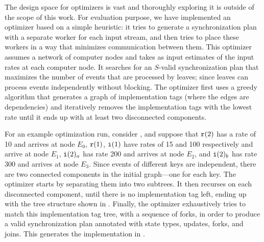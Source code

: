 The design space for optimizers is vast and thoroughly exploring it is
outside of the scope of this work. For evaluation purpose, we have implemented an optimizer based on a simple
heuristic: it tries to generate a synchronization plan with a
separate worker for each input stream, and then tries to place these
workers in a way that minimizes communication between them.
This optimizer assumes a network of computer nodes and takes as input
estimates of the input rates at each computer node. It searches for an
$S$-valid synchronization plan that maximizes the number of events
that are processed by leaves; since leaves can process events
independently without blocking. The optimizer first uses a greedy
algorithm that generates a graph of implementation tags (where the
edges are dependencies) and iteratively removes the implementation
tags with the lowest rate until it ends up with at least two
disconnected components. 

\begin{example}
\label{example:optimization}
For an example optimization run, consider ,
and suppose that $\texttt{r}(2)$ has a rate of 10 and arrives at node $E_0$,
$\texttt{r}(1)$, $\texttt{i}(1)$ have rates of 15 and 100 respectively and arrive at node $E_1$,
$\texttt{i}(2)_a$ has rate 200 and arrives at node $E_2$,
and $\texttt{i}(2)_b$ has rate 300 and arrives at node $E_3$.
Since events of different keys are independent, there are
two connected components in the initial graph---one for each
key. The optimizer starts by separating them into two
subtrees. It then recurses on each disconnected component, until there
is no implementation tag left, ending up with the tree structure shown
in . Finally, the optimizer
exhaustively tries to match this implementation tag tree, with a
sequence of forks, in order to produce a valid synchronization plan
annotated with state types, updates, forks, and joins.
This generates the implementation in .
\end{example}

